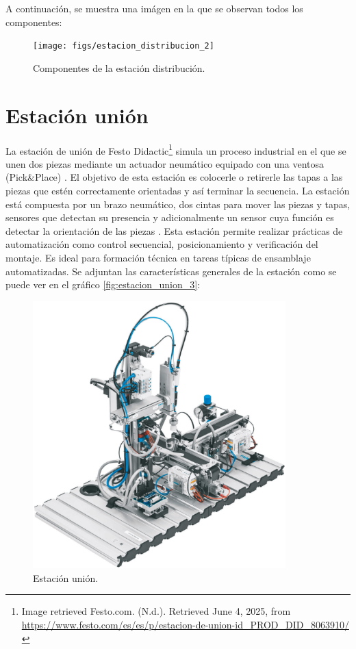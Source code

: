 A continuación, se muestra una imágen en la que se observan todos los componentes:

\begin{figure} [h!]
  \begin{center}
    \texttt{[image: figs/estacion\_distribucion\_2]}
  \end{center}
  \caption{\centering Componentes de la estación distribución.}
  \label{fig:estacion_distribucion_2}
\end{figure} 

\section{Estación unión}
\label{sec:estacion_union}

La estación de unión de Festo Didactic\footnote{Image retrieved Festo.com.  (N.d.). Retrieved June 4, 2025, from  \url{https://www.festo.com/es/es/p/estacion-de-union-id_PROD_DID_8063910/}} simula un proceso industrial en el que se unen dos piezas mediante un actuador neumático equipado con una ventosa (Pick\&Place) \cite{estacion_union}. El objetivo de esta estación es colocerle o retirerle las tapas a las piezas que estén correctamente orientadas y así terminar la secuencia. La estación está compuesta por un brazo neumático, dos cintas para mover las piezas y tapas, sensores que detectan su presencia y adicionalmente un sensor cuya función es detectar la orientación de las piezas \cite{estacion_union}. Esta estación permite realizar prácticas de automatización como control secuencial, posicionamiento y verificación del montaje. Es ideal para formación técnica en tareas típicas de ensamblaje automatizadas. Se adjuntan las características generales de la estación como se puede ver en el gráfico \ref{fig:estacion_union_3}:


\begin{figure} [h!]
  \begin{center}
    \includegraphics[width=9.75cm]{figs/estacion_union_1}
  \end{center}
  \caption{\centering Estación unión. \cite{estacion_union}}
  \label{fig:estacion_union_1}
\end{figure} 

